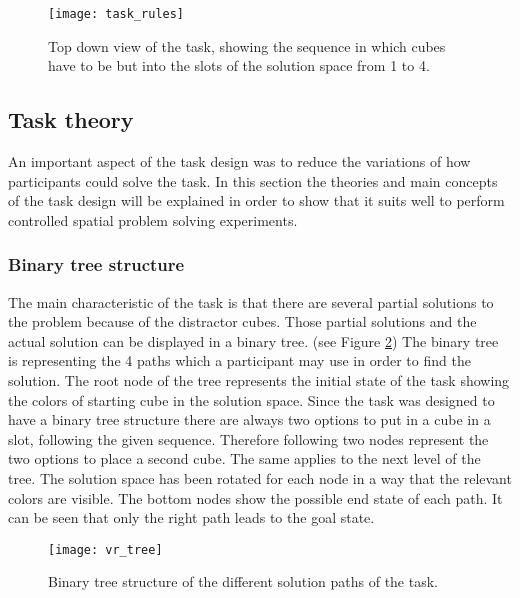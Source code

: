 \begin{figure}[h]
\centering
\texttt{[image: task\_rules]}
\caption{Top down view of the task, showing the sequence in which cubes have to be but into the slots of the solution space from 1 to 4. }
\label{fig:task_rules}
\end{figure}

\subsection{Task theory}
An important aspect of the task design was to reduce the variations of how participants could solve the task. In this section the theories and main concepts of the task design will be explained in order to show that it suits well to perform controlled spatial problem solving experiments.

\subsubsection{Binary tree structure}
The main characteristic of the task is that there are several partial solutions to the problem because of the distractor cubes. Those partial solutions and the actual solution can be displayed in a binary tree. (see Figure \ref{fig:vr_tree}) The binary tree is representing the 4 paths which a participant may use in order to find the solution. The root node of the tree represents the initial state of the task showing the colors of starting cube in the solution space. Since the task was designed to have a binary tree structure there are always two options to put in a cube in a slot, following the given sequence. Therefore following two nodes represent the two options to place a second cube. The same applies to the next level of the tree. The solution space has been rotated for each node in a way that the relevant colors are visible. The bottom nodes show the possible end state of each path. It can be seen that only the right path leads to the goal state.

\begin{figure}[h]
\centering
\texttt{[image: vr\_tree]}
\caption{Binary tree structure of the different solution paths of the task.}
\label{fig:vr_tree}
\end{figure}

